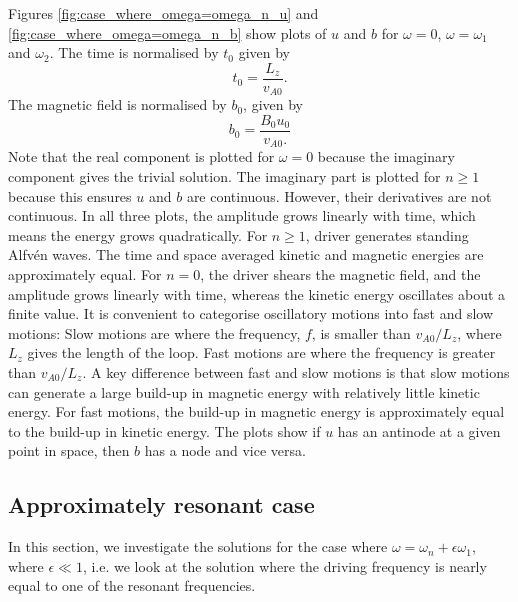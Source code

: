 Figures \ref{fig:case_where_omega=omega_n_u} and \ref{fig:case_where_omega=omega_n_b} show plots of $u$ and $b$ for $\omega=0$, $\omega=\omega_1$ and $\omega_2$. The time is normalised by $t_0$ given by 
\begin{equation}
    \label{eq:t0}
    t_0=\frac{L_z}{v_{A0}}.
\end{equation}
The magnetic field is normalised by $b_0$, given by
\begin{equation}
    \label{eq:b0}
    b_0=\frac{B_0u_0}{v_{A0}.}
\end{equation}
Note that the real component is plotted for $\omega=0$ because the imaginary component gives the trivial solution. The imaginary part is plotted for $n\ge1$ because this ensures $u$ and $b$ are continuous. However, their derivatives are not continuous. In all three plots, the amplitude grows linearly with time, which means the energy grows quadratically. For $n\ge1$, driver generates standing Alfv\'en waves. The time and space averaged kinetic and magnetic energies are approximately equal. For $n=0$, the driver shears the magnetic field, and the amplitude grows linearly with time, whereas the kinetic energy oscillates about a finite value. It is convenient to categorise oscillatory motions into fast and slow motions: Slow motions are where the frequency, $f$, is smaller than $v_{A0}/L_z$, where $L_z$ gives the length of the loop. Fast motions are where the frequency is greater than $v_{A0}/L_z$. A key difference between fast and slow motions is that slow motions can generate a large build-up in magnetic energy with relatively little kinetic energy. For fast motions, the build-up in magnetic energy is approximately equal to the build-up in kinetic energy. The plots show if $u$ has an antinode at a given point in space, then $b$ has a node and vice versa.

\subsection{Approximately resonant case}
\label{sec:case_where_omega_approx_omega_n}

In this section, we investigate the solutions for the case where $\omega = \omega_n + \epsilon \omega_1$, where $\epsilon\ll1$, i.e. we look at the solution where the driving frequency is nearly equal to one of the resonant frequencies.

